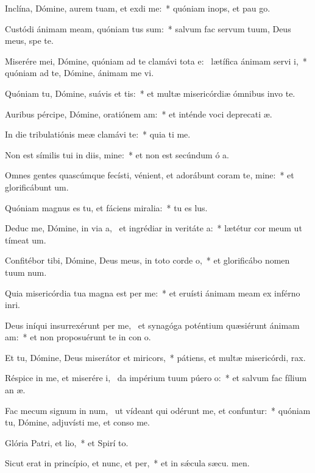 \item Inclína, Dómine, aurem tuam, et exdi me:~* quóniam inops, et pau  go.
\item Custódi ánimam meam, quóniam tus sum:~* salvum fac servum tuum, Deus meus, spe  te.
\item Miserére mei, Dómine, quóniam ad te clamávi tota e:~\pscross{} lætífica ánimam servi i,~* quóniam ad te, Dómine, ánimam me vi.
\item Quóniam tu, Dómine, suávis et tis:~* et multæ misericórdiæ ómnibus invo te.
\item Auribus pércipe, Dómine, oratiónem am:~* et inténde voci deprecati æ.
\item In die tribulatiónis meæ clamávi  te:~* quia ti me.
\item Non est símilis tui in diis, mine:~* et non est secúndum ó a.
\item Omnes gentes quascúmque fecísti, vénient, et adorábunt coram te, mine:~* et glorificábunt  um.
\item Quóniam magnus es tu, et fáciens miralia:~* tu es  lus.
\item Deduc me, Dómine, in via a,~\pscross{} et ingrédiar in veritáte a:~* lætétur cor meum ut tímeat  um.
\item Confitébor tibi, Dómine, Deus meus, in toto corde o,~* et glorificábo nomen tuum  num.
\item Quia misericórdia tua magna est per me:~* et eruísti ánimam meam ex inférno inri.
\item Deus iníqui insurrexérunt per me,~\pscross{} et synagóga poténtium quæsiérunt ánimam am:~* et non proposuérunt te in con o.
\item Et tu, Dómine, Deus miserátor et miricors,~* pátiens, et multæ misericórdi,  rax.
\item Réspice in me, et miserére i,~\pscross{} da impérium tuum púero o:~* et salvum fac fílium an æ.
\item Fac mecum signum in num,~\pscross{} ut vídeant qui odérunt me, et confuntur:~* quóniam tu, Dómine, adjuvísti me, et conso  me.
\item Glória Patri, et lio,~* et Spirí to.
\item Sicut erat in princípio, et nunc, et per,~* et in sǽcula sæcu. men.
